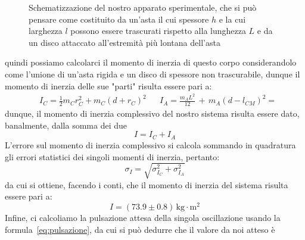 \documentclass{article}
\begin{document}
\begin{figure}[H]
	\centering
{}
\caption{Schematizzazione del nostro apparato sperimentale, che si può pensare come costituito da un'asta il cui spessore $h$ e la cui larghezza $l$ possono essere trascurati rispetto alla lunghezza $L$ e da un disco attaccato all'estremità più lontana dell'asta}
\end{figure}
\noindent quindi possiamo calcolarci il momento di inerzia di questo corpo considerandolo come l'unione di un'asta rigida e un disco di spessore non trascurabile, dunque il momento di inerzia delle sue "parti" risulta essere pari a:
\begin{align*}
	&I_C = \frac{1}{2} m_C r^2_C + m_C (d + r_C)^2 & &I_A = \frac{m_A L^2}{12} \, + \, m_A (d - l_{CM})^2 = 
\end{align*}
dunque, il momento di inerzia complessivo del nostro sistema risulta essere dato, banalmente, dalla somma dei due
\begin{equation*}
	I = I_C + I_A
\end{equation*}
L'errore sul momento di inerzia complessivo si calcola sommando in quadratura gli errori statistici dei singoli momenti di inerzia, pertanto:
\begin{equation*}
	\sigma_I = \sqrt{\sigma_{I_C}^2 + \sigma_{I_A}^2}
\end{equation*}
da cui si ottiene, facendo i conti, che il momento di inerzia del sistema risulta essere pari a:
\begin{equation}
	I = (73.9 \pm 0.8) \, \si{\kilogram \cdot \meter^2}
\end{equation}
Infine, ci calcoliamo la pulsazione attesa della singola oscillazione usando la formula~\ref{eq:pulsazione}, da cui si può dedurre che il valore da noi atteso è
\end{document}
